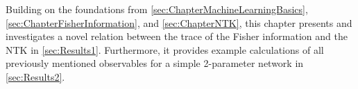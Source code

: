 Building on the foundations from \cref{sec:ChapterMachineLearningBasics}, \cref{sec:ChapterFisherInformation}, and \cref{sec:ChapterNTK}, this chapter presents and investigates a novel relation between the trace of the Fisher information and the NTK in \cref{sec:Results1}. Furthermore, it provides example calculations of all previously mentioned observables for a simple 2-parameter network in \cref{sec:Results2}.
